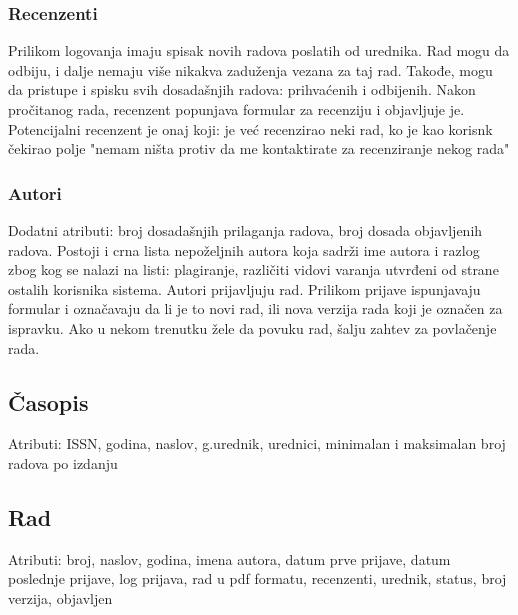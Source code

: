 \documentclass[a4paper]{article}
\begin{document}
    \subsubsection{Recenzenti}
    Prilikom logovanja imaju spisak novih radova poslatih od urednika. Rad mogu da odbiju, i dalje nemaju više nikakva zaduženja vezana za taj rad. Takođe, mogu da pristupe i spisku svih dosadašnjih radova: prihvaćenih i odbijenih. Nakon pročitanog rada, recenzent popunjava formular za recenziju i objavljuje je. Potencijalni recenzent je onaj koji: je već recenzirao neki rad, ko je  kao korisnk čekirao polje "nemam ništa protiv da me kontaktirate za recenziranje nekog rada"
    
    \subsubsection{Autori}
    Dodatni atributi: broj dosadašnjih prilaganja radova, broj dosada objavljenih radova. Postoji i crna lista nepoželjnih autora koja sadrži ime autora i razlog zbog kog se nalazi na listi:  plagiranje, različiti vidovi varanja utvrđeni od strane ostalih korisnika sistema. Autori prijavljuju rad. Prilikom prijave ispunjavaju formular i označavaju da li je to novi rad, ili nova verzija rada koji je označen za ispravku. Ako u nekom trenutku žele da povuku rad, šalju zahtev za povlačenje rada.

\subsection{Časopis}
Atributi: ISSN, godina, naslov, g.urednik, urednici, minimalan i maksimalan broj radova po izdanju

\subsection{Rad}
    Atributi: broj, naslov, godina, imena autora, datum prve prijave, datum poslednje prijave, log prijava, rad u pdf formatu, recenzenti, urednik, status, broj verzija, objavljen
    
\end{document}
